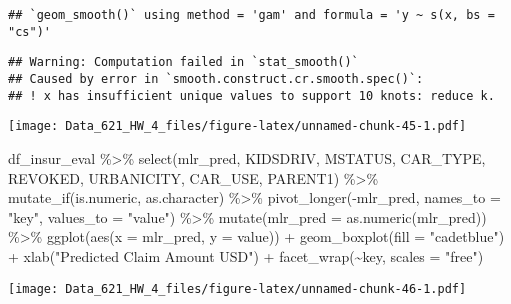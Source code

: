 \documentclass[
]{article}
\newenvironment{Shaded}{\begin{snugshade}}{\end{snugshade}}
\newcommand{\AttributeTok}[1]{\textcolor[rgb]{0.77,0.63,0.00}{#1}}
\newcommand{\FunctionTok}[1]{\textcolor[rgb]{0.00,0.00,0.00}{#1}}
\newcommand{\NormalTok}[1]{#1}
\newcommand{\SpecialCharTok}[1]{\textcolor[rgb]{0.00,0.00,0.00}{#1}}
\newcommand{\StringTok}[1]{\textcolor[rgb]{0.31,0.60,0.02}{#1}}
\begin{document}
\begin{verbatim}
## `geom_smooth()` using method = 'gam' and formula = 'y ~ s(x, bs = "cs")'
\end{verbatim}

\begin{verbatim}
## Warning: Computation failed in `stat_smooth()`
## Caused by error in `smooth.construct.cr.smooth.spec()`:
## ! x has insufficient unique values to support 10 knots: reduce k.
\end{verbatim}

\texttt{[image: Data\_621\_HW\_4\_files/figure-latex/unnamed-chunk-45-1.pdf]}

\begin{Shaded}
\begin{Highlighting}[]
\NormalTok{df\_insur\_eval }\SpecialCharTok{\%\textgreater{}\%} 
  \FunctionTok{select}\NormalTok{(mlr\_pred, KIDSDRIV, MSTATUS, CAR\_TYPE, REVOKED, URBANICITY, CAR\_USE,}
\NormalTok{         PARENT1) }\SpecialCharTok{\%\textgreater{}\%} 
  \FunctionTok{mutate\_if}\NormalTok{(is.numeric, as.character) }\SpecialCharTok{\%\textgreater{}\%} 
  \FunctionTok{pivot\_longer}\NormalTok{(}\SpecialCharTok{{-}}\NormalTok{mlr\_pred, }\AttributeTok{names\_to =} \StringTok{"key"}\NormalTok{, }\AttributeTok{values\_to =} \StringTok{"value"}\NormalTok{) }\SpecialCharTok{\%\textgreater{}\%} 
  \FunctionTok{mutate}\NormalTok{(}\AttributeTok{mlr\_pred =} \FunctionTok{as.numeric}\NormalTok{(mlr\_pred)) }\SpecialCharTok{\%\textgreater{}\%} 
  \FunctionTok{ggplot}\NormalTok{(}\FunctionTok{aes}\NormalTok{(}\AttributeTok{x =}\NormalTok{ mlr\_pred, }\AttributeTok{y =}\NormalTok{ value)) }\SpecialCharTok{+} 
  \FunctionTok{geom\_boxplot}\NormalTok{(}\AttributeTok{fill =} \StringTok{"cadetblue"}\NormalTok{) }\SpecialCharTok{+} 
  \FunctionTok{xlab}\NormalTok{(}\StringTok{"Predicted Claim Amount USD"}\NormalTok{) }\SpecialCharTok{+}
  \FunctionTok{facet\_wrap}\NormalTok{(}\SpecialCharTok{\textasciitilde{}}\NormalTok{key, }\AttributeTok{scales =} \StringTok{"free"}\NormalTok{)}
\end{Highlighting}
\end{Shaded}

\texttt{[image: Data\_621\_HW\_4\_files/figure-latex/unnamed-chunk-46-1.pdf]}
\end{document}
